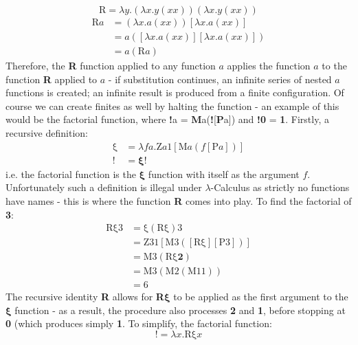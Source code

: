 \documentclass[Master.tex]{subfiles}
\begin{document}
\begin{equation*}
\bm{\mathrm{R}} = \lambda y.(\lambda x.y(xx))(\lambda x.y(xx))
\end{equation*}
\begin{equation*}
\begin{aligned}
\bm{\mathrm{R}}a &= (\lambda x.a(xx))[\lambda x.a(xx)]\\
&= a([\lambda x.a(xx)][\lambda x.a(xx)])\\
&= a(\bm{\mathrm{R}}a)
\end{aligned}
\end{equation*}
Therefore, the \textbf{R} function applied to any function $a$ applies the function $a$ to the function \textbf{R} applied to $a$ - if substitution continues, an infinite series of nested $a$ functions is created; an infinite result is produced from a finite configuration. Of course we can create finites as well by halting the function - an example of this would be the factorial function, where \textbf{!}a = \textbf{M}a(\textbf{!}[\textbf{P}a]) and \textbf{!0} = \textbf{1}. Firstly, a recursive definition:
\begin{equation*}
\begin{aligned}
\bm{\mathrm{\xi}} &= \lambda fa.\bm{\mathrm{Z}}a\bm{\mathrm{1}}[\bm{\mathrm{M}}a(f[\bm{\mathrm{P}}a])]\\
\bm{!} &= \bm{\xi}!
\end{aligned}
\end{equation*}
i.e. the factorial function is the $\bm{\xi}$ function with itself as the argument $f$. Unfortunately such a definition is illegal under $\lambda$-Calculus as strictly no functions have names - this is where the function \textbf{R} comes into play. To find the factorial of \textbf{3}:
\begin{equation*}
\begin{aligned}
\bm{\mathrm{R\xi 3}} &= \bm{\mathrm{\xi}}(\bm{\mathrm{R\xi}})\bm{\mathrm{3}}\\
&= \bm{\mathrm{Z31}}[\bm{\mathrm{M3}}([\bm{\mathrm{R\xi}}][\bm{\mathrm{P3}}])]\\
&= \bm{\mathrm{M3}}(\bm{\mathrm{R\xi}}\bm{2})\\
&= \bm{\mathrm{M3}}(\bm{\mathrm{M2}}(\bm{\mathrm{M11}}))\\
&= \bm{\mathrm{6}}
\end{aligned}
\end{equation*}
The recursive identity \textbf{R} allows for \textbf{R}$\bm{\xi}$ to be applied as the first argument to the $\bm{\xi}$ function - as a result, the procedure also processes \textbf{2} and \textbf{1}, before stopping at \textbf{0} (which produces simply \textbf{1}. To simplify, the factorial function:
\begin{equation*}
\bm{!} = \lambda x.\bm{\mathrm{R\xi}}x
\end{equation*}
\end{document}
